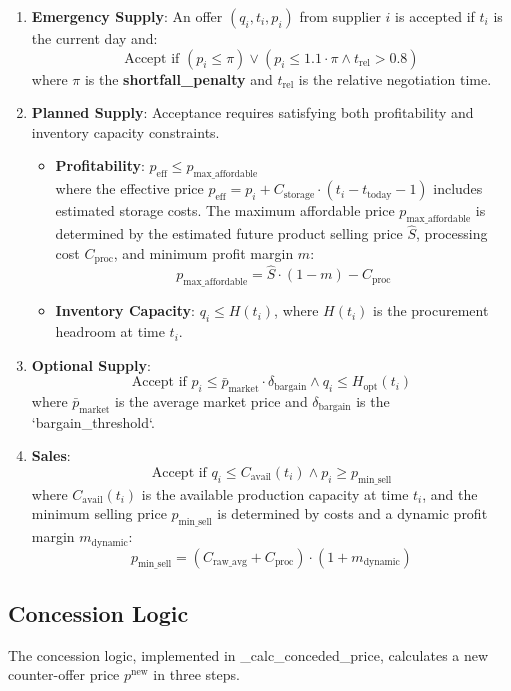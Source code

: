 \documentclass[12pt, a4paper]{article}
\begin{document}
\begin{enumerate}
\item \textbf{Emergency Supply}: An offer $(q_i, t_i, p_i)$ from supplier $i$ is accepted if $t_i$ is the current day and:
$$
\text{Accept if } (p_i \le \pi) \lor (p_i \le 1.1 \cdot \pi \land t_{\text{rel}} > 0.8)
$$
where $\pi$ is the \textbf{shortfall\_penalty} and $t_{\text{rel}}$ is the relative negotiation time.

\item \textbf{Planned Supply}: Acceptance requires satisfying both profitability and inventory capacity constraints.
\begin{itemize}
    \item \textbf{Profitability}: $p_{\text{eff}} \le p_{\text{max\_affordable}}$ \\
    where the effective price $p_{\text{eff}} = p_i + C_{\text{storage}} \cdot (t_i - t_{\text{today}} - 1)$ includes estimated storage costs. The maximum affordable price $p_{\text{max\_affordable}}$ is determined by the estimated future product selling price $\hat{S}$, processing cost $C_{\text{proc}}$, and minimum profit margin $m$:
    $$
    p_{\text{max\_affordable}} = \hat{S} \cdot (1 - m) - C_{\text{proc}}
    $$
    \item \textbf{Inventory Capacity}: $q_i \le H(t_i)$, where $H(t_i)$ is the procurement headroom at time $t_i$.
\end{itemize}

\item \textbf{Optional Supply}: 
$$
\text{Accept if } p_i \le \bar{p}_{\text{market}} \cdot \delta_{\text{bargain}} \land q_i \le H_{\text{opt}}(t_i)
$$
where $\bar{p}_{\text{market}}$ is the average market price and $\delta_{\text{bargain}}$ is the `bargain\_threshold`.

\item \textbf{Sales}:
$$
\text{Accept if } q_i \le C_{\text{avail}}(t_i) \land p_i \ge p_{\text{min\_sell}}
$$
where $C_{\text{avail}}(t_i)$ is the available production capacity at time $t_i$, and the minimum selling price $p_{\text{min\_sell}}$ is determined by costs and a dynamic profit margin $m_{\text{dynamic}}$:
$$
p_{\text{min\_sell}} = (C_{\text{raw\_avg}} + C_{\text{proc}}) \cdot (1 + m_{\text{dynamic}})
$$
\end{enumerate}

\subsection{Concession Logic}
The concession logic, implemented in \_calc\_conceded\_price, calculates a new counter-offer price $p^{\text{new}}$ in three steps.
\end{document}
